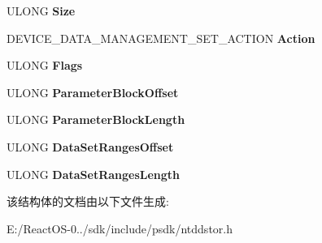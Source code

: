 \begin{DoxyCompactItemize}
\item 
\mbox{\label{struct___d_e_v_i_c_e___m_a_n_a_g_e___d_a_t_a___s_e_t___a_t_t_r_i_b_u_t_e_s_a117d6a2e2a3179a1f9f2cacac8488f3c}} 
U\+L\+O\+NG {\bfseries Size}
\item 
\mbox{\label{struct___d_e_v_i_c_e___m_a_n_a_g_e___d_a_t_a___s_e_t___a_t_t_r_i_b_u_t_e_s_a523321ac13b9d94754d9a41e5ecb5fc7}} 
D\+E\+V\+I\+C\+E\+\_\+\+D\+A\+T\+A\+\_\+\+M\+A\+N\+A\+G\+E\+M\+E\+N\+T\+\_\+\+S\+E\+T\+\_\+\+A\+C\+T\+I\+ON {\bfseries Action}
\item 
\mbox{\label{struct___d_e_v_i_c_e___m_a_n_a_g_e___d_a_t_a___s_e_t___a_t_t_r_i_b_u_t_e_s_a5168dc6b05c1652c96b9432ad40e79be}} 
U\+L\+O\+NG {\bfseries Flags}
\item 
\mbox{\label{struct___d_e_v_i_c_e___m_a_n_a_g_e___d_a_t_a___s_e_t___a_t_t_r_i_b_u_t_e_s_a6df0b29878ed9e6635e2bfb1025b5b52}} 
U\+L\+O\+NG {\bfseries Parameter\+Block\+Offset}
\item 
\mbox{\label{struct___d_e_v_i_c_e___m_a_n_a_g_e___d_a_t_a___s_e_t___a_t_t_r_i_b_u_t_e_s_a61874fdf2babacea519cd8da2f055597}} 
U\+L\+O\+NG {\bfseries Parameter\+Block\+Length}
\item 
\mbox{\label{struct___d_e_v_i_c_e___m_a_n_a_g_e___d_a_t_a___s_e_t___a_t_t_r_i_b_u_t_e_s_a798de6300b9e6d893f271b3cbff5317a}} 
U\+L\+O\+NG {\bfseries Data\+Set\+Ranges\+Offset}
\item 
\mbox{\label{struct___d_e_v_i_c_e___m_a_n_a_g_e___d_a_t_a___s_e_t___a_t_t_r_i_b_u_t_e_s_a92b3bc90e6c5a2cb7eca14da8e7fe9fd}} 
U\+L\+O\+NG {\bfseries Data\+Set\+Ranges\+Length}
\end{DoxyCompactItemize}


该结构体的文档由以下文件生成\+:\begin{DoxyCompactItemize}
\item 
E\+:/\+React\+O\+S-\/0../sdk/include/psdk/ntddstor.\+h\end{DoxyCompactItemize}
